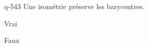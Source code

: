 \begin{truefalse}{q-543}
Une isométrie préserve les barycentres.
\item* Vrai
\item Faux
\end{truefalse}

